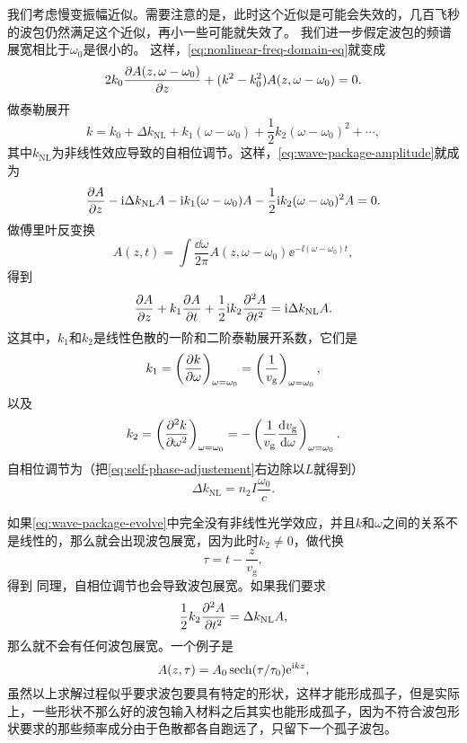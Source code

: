 我们考虑慢变振幅近似。需要注意的是，此时这个近似是可能会失效的，几百飞秒的波包仍然满足这个近似，再小一些可能就失效了。
我们进一步假定波包的频谱展宽相比于$\omega_0$是很小的。
这样，\eqref{eq:nonlinear-freq-domain-eq}就变成
\begin{equation}
    2 k_0 \pdv{A(z, \omega - \omega_0)}{z} + (k^2 - k_0^2) A(z, \omega - \omega_0) = 0.
    \label{eq:wave-package-amplitude}
\end{equation}
做泰勒展开
\[
    k = k_0 + \Delta k_\text{NL} + k_1 (\omega - \omega_0) + \frac{1}{2} k_2 (\omega - \omega_0)^2 + \cdots,
\]
其中$k_\text{NL}$为非线性效应导致的自相位调节。这样，\eqref{eq:wave-package-amplitude}就成为
\begin{equation}
    \pdv{A}{z} - \mathrm{i} \Delta k_\text{NL} A - \mathrm{i} k_1 (\omega - \omega_0) A - \frac{1}{2} \mathrm{i} k_2 (\omega - \omega_0)^2 A = 0.
\end{equation}
做傅里叶反变换
\[
    A(z, t) = \int \frac{\dd{\omega}}{2\pi} A(z, \omega - \omega_0) \ee^{- \ii (\omega - \omega_0) t},
\]
得到
\begin{equation}
    \pdv{A}{z} + k_1 \pdv{A}{t} + \frac{1}{2} \mathrm{i} k_2 \pdv[2]{A}{t} = \mathrm{i} \Delta k_\text{NL} A.
    \label{eq:wave-package-evolve}
\end{equation}
这其中，$k_1$和$k_2$是线性色散的一阶和二阶泰勒展开系数，它们是
\begin{equation}
    k_1 = \left(\pdv{k}{\omega}\right)_{\omega = \omega_0} = \left( \frac{1}{v_\text{g}} \right)_{\omega = \omega_0},
\end{equation}
以及
\begin{equation}
    k_2 = \left( \pdv[2]{k}{\omega} \right)_{\omega = \omega_0} = - \left( \frac{1}{v_\text{g}} \dv{v_\text{g}}{\omega} \right)_{\omega = \omega_0}.
\end{equation}
自相位调节为（把\eqref{eq:self-phase-adjustement}右边除以$L$就得到）
\begin{equation}
    \Delta k_\text{NL} = n_2 I \frac{\omega_0}{c}.
\end{equation}

如果\eqref{eq:wave-package-evolve}中完全没有非线性光学效应，并且$k$和$\omega$之间的关系不是线性的，那么就会出现波包展宽，因为此时$k_2 \neq 0$，做代换
\[
    \tau = t - \frac{z}{v_\text{g}},
\]
得到%
同理，自相位调节也会导致波包展宽。如果我们要求
\begin{equation}
    \frac{1}{2} k_2 \pdv[2]{A}{t} = \Delta k_\text{NL} A,
\end{equation}
那么就不会有任何波包展宽。一个例子是
\begin{equation}
    A(z, \tau) = A_0 \sech(\tau / \tau_0) \ee^{\ii k z},
\end{equation}
虽然以上求解过程似乎要求波包要具有特定的形状，这样才能形成孤子，但是实际上，一些形状不那么好的波包输入材料之后其实也能形成孤子，因为不符合波包形状要求的那些频率成分由于色散都各自跑远了，只留下一个孤子波包。

